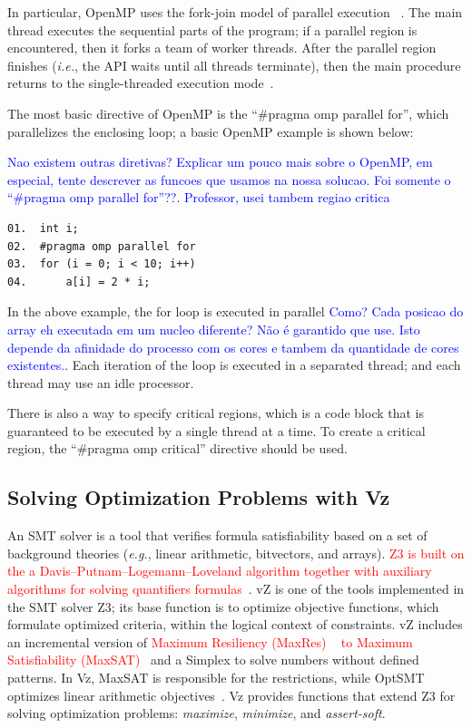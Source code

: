 In particular, OpenMP uses the fork-join model of parallel execution ~\cite{OpenMP1998}. The main thread executes the sequential parts of the program; if a parallel region is encountered, then it forks a team of worker threads. After the parallel region finishes ({\it i.e.}, the API waits until all threads terminate), then the main procedure returns to the single-threaded execution mode~\cite{Wu2014}.

The most basic directive of OpenMP is the ``\#pragma omp parallel for'', which parallelizes the enclosing loop; a basic OpenMP example is shown below:

\textcolor{blue}{Nao existem outras diretivas? Explicar um pouco mais sobre o OpenMP, em especial, tente descrever as funcoes que usamos na nossa solucao. Foi somente o ``\#pragma omp parallel for''??. Professor, usei tambem regiao critica}

\begin{lstlisting}[caption=OpenMP basic sample]
01.  int i;
02.  #pragma omp parallel for
03.  for (i = 0; i < 10; i++)
04.      a[i] = 2 * i;
\end{lstlisting}

In the above example, the for loop is executed in parallel \textcolor{blue}{Como? Cada posicao do array eh executada em um nucleo diferente? Não é garantido que use. Isto depende da afinidade do processo com os cores e tambem da quantidade de cores existentes.}. Each iteration of the loop is executed in a separated thread; and each thread may use an idle processor.

There is also a way to specify critical regions, which is a code block that is guaranteed to be executed by a single thread at a time. To create a critical region, the ``\#pragma omp critical'' directive should be used.
\subsection{Solving Optimization Problems with Vz}
\label{Optimization-with-Vz}

An SMT solver is a tool that verifies formula satisfiability based on a set of background theories ({\it e.g.}, linear arithmetic, bitvectors, and arrays). \textcolor{red}{Z3 is built on the a Davis–Putnam–Logemann–Loveland algorithm together with auxiliary algorithms for solving quantifiers formulas~\cite{Bjorner2014}}. vZ is one of the tools implemented in the SMT solver Z3; its base function is to optimize objective functions, which formulate optimized criteria, within the logical context of constraints.  vZ includes an incremental version of  \textcolor{red}{Maximum Resiliency (MaxRes) ~\cite{Federica2008} to Maximum Satisfiability (MaxSAT)~\cite{NarodytskaN}} and a Simplex to solve numbers without defined patterns. In Vz, MaxSAT is responsible for the restrictions, while OptSMT optimizes linear arithmetic objectives~\cite{Bjorner2015}. Vz provides functions that extend Z3 for solving optimization problems: \textit{maximize}, \textit{minimize}, and \textit{assert-soft}.

